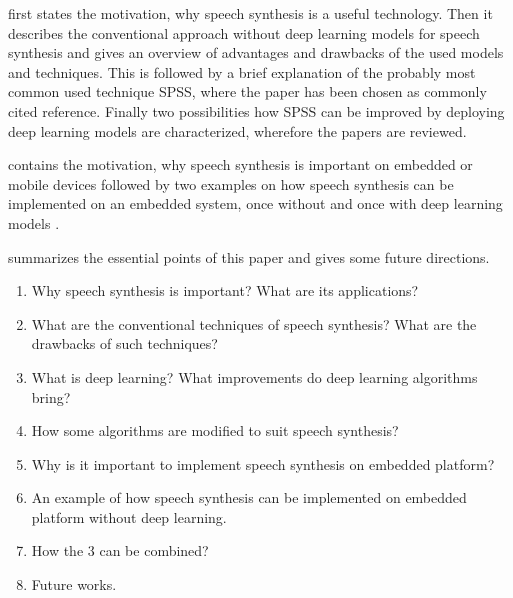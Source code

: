 \vspace{1em}

\begin{description}[leftmargin=10pt]
	\item[Section \ref{sec:speech}] first states the motivation, why speech synthesis is a useful technology. Then it describes the conventional approach without deep learning models for speech synthesis and gives an overview of advantages and drawbacks of the used models and techniques. This is followed by a brief explanation of the probably most common used technique \ac{SPSS}, where the paper \cite{zen:statistical} has been chosen as commonly cited reference. Finally two possibilities how \ac{SPSS} can be improved by deploying deep learning models are characterized, wherefore the papers \cite{zen:deepstatistical, hashimoto:effect} are reviewed.
	\item[Section \ref{sec:embeddedspeech}] contains the motivation, why speech synthesis is important on embedded or mobile devices followed by two examples on how speech synthesis can be implemented on an embedded system, once without \cite{toth:optimizing} and once with deep learning models \cite{boros:robust}.
	\item[Section \ref{sec:conclusion}] summarizes the essential points of this paper and gives some future directions.
\end{description}

\vspace{1em}

\begin{enumerate}[leftmargin=16pt]
	\item \textcolor{black!40}{Why speech synthesis is important? What are its applications?}
	\item \textcolor{black!40}{What are the conventional techniques of speech synthesis? What are the drawbacks of such techniques?}
	\item \textcolor{black!40}{What is deep learning? What improvements do deep learning algorithms bring?}
	\item How some algorithms are modified to suit speech synthesis?
	\item Why is it important to implement speech synthesis on embedded platform?
	\item An example of how speech synthesis can be implemented on embedded platform without deep learning.
	\item How the 3 can be combined?
	\item Future works.
\end{enumerate}

